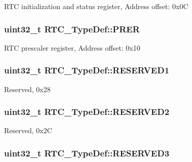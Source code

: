 R\-T\-C initialization and status register, Address offset\-: 0x0\-C \hypertarget{struct_r_t_c___type_def_a5f43a11e0873212f598e41db5f2dcf6a}{
\subsubsection[{P\-R\-E\-R}]{ uint32\-\_\-t R\-T\-C\-\_\-\-Type\-Def\-::\-P\-R\-E\-R}}\label{struct_r_t_c___type_def_a5f43a11e0873212f598e41db5f2dcf6a}
R\-T\-C prescaler register, Address offset\-: 0x10 \hypertarget{struct_r_t_c___type_def_a761d5a0c208032613dad3fcc674907b7}{
\subsubsection[{R\-E\-S\-E\-R\-V\-E\-D1}]{\setlength{\rightskip}{0pt plus 5cm}uint32\-\_\-t R\-T\-C\-\_\-\-Type\-Def\-::\-R\-E\-S\-E\-R\-V\-E\-D1}}\label{struct_r_t_c___type_def_a761d5a0c208032613dad3fcc674907b7}
Reserved, 0x28 \hypertarget{struct_r_t_c___type_def_afddb6b2f393c94ea6c68780fe04f298f}{
\subsubsection[{R\-E\-S\-E\-R\-V\-E\-D2}]{\setlength{\rightskip}{0pt plus 5cm}uint32\-\_\-t R\-T\-C\-\_\-\-Type\-Def\-::\-R\-E\-S\-E\-R\-V\-E\-D2}}\label{struct_r_t_c___type_def_afddb6b2f393c94ea6c68780fe04f298f}
Reserved, 0x2\-C \hypertarget{struct_r_t_c___type_def_ab8970cf003966d22733fd660df6e74d7}{
\subsubsection[{R\-E\-S\-E\-R\-V\-E\-D3}]{\setlength{\rightskip}{0pt plus 5cm}uint32\-\_\-t R\-T\-C\-\_\-\-Type\-Def\-::\-R\-E\-S\-E\-R\-V\-E\-D3}}\label{struct_r_t_c___type_def_ab8970cf003966d22733fd660df6e74d7}
